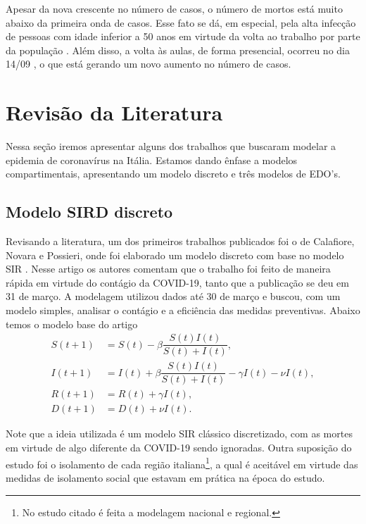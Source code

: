 \documentclass{article}
\begin{document}
Apesar da nova crescente no número de casos, o número de mortos está muito abaixo da primeira onda de casos. Esse fato se dá, em especial, pela alta infecção de pessoas com idade inferior a 50 anos \cite{istoe_idade} em virtude da volta ao trabalho por parte da população \cite{folha_trabalho}. Além disso, a volta às aulas, de forma presencial, ocorreu no dia 14/09 \cite{uol_aulas}, o que está gerando um novo aumento no número de casos.

\section{Revisão da Literatura}

Nessa seção iremos apresentar alguns dos trabalhos que buscaram modelar a epidemia de coronavírus na Itália. Estamos dando ênfase a modelos compartimentais, apresentando um modelo discreto e três modelos de EDO's.

\subsection{Modelo SIRD discreto}

Revisando a literatura, um dos primeiros trabalhos publicados foi o de Calafiore, Novara e Possieri, onde foi elaborado um modelo discreto com base no modelo SIR \cite{calafiore2020modified}. Nesse artigo os autores comentam que o trabalho foi feito de maneira rápida em virtude do contágio da COVID-19, tanto que a publicação se deu em 31 de março. A modelagem utilizou dados até 30 de março e buscou, com um modelo simples, analisar o contágio e a eficiência das medidas preventivas. Abaixo temos o modelo base do artigo
\begin{equation*}
    \begin{split}
        S(t + 1) & = S(t) - \beta \dfrac{S(t) I(t)}{S(t) + I(t)}, \\
        I(t + 1) & = I(t) + \beta \dfrac{S(t) I(t)}{S(t) + I(t)} - \gamma I(t) - \nu I(t), \\
        R(t + 1) & = R(t) + \gamma I(t), \\
        D(t + 1) & = D(t) + \nu I(t).
    \end{split}
\end{equation*}

Note que a ideia utilizada é um modelo SIR clássico discretizado, com as mortes em virtude de algo diferente da COVID-19 sendo ignoradas. Outra suposição do estudo foi o isolamento de cada região italiana\footnote{No estudo citado é feita a modelagem nacional e regional.}, a qual é aceitável em virtude das medidas de isolamento social que estavam em prática na época do estudo.
\end{document}
